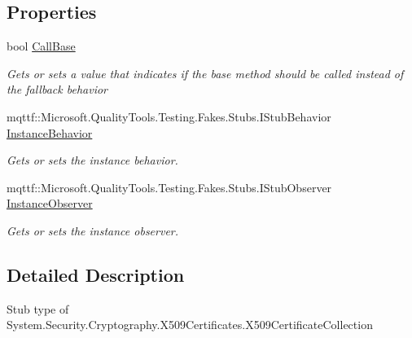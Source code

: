 \subsection*{Properties}
\begin{DoxyCompactItemize}
\item 
bool \hyperlink{class_system_1_1_security_1_1_cryptography_1_1_x509_certificates_1_1_fakes_1_1_stub_x509_certificate_collection_ad9063a236cf97171a35e15c93b04e174}{Call\-Base}
\begin{DoxyCompactList}\small\item\em Gets or sets a value that indicates if the base method should be called instead of the fallback behavior\end{DoxyCompactList}\item 
mqttf\-::\-Microsoft.\-Quality\-Tools.\-Testing.\-Fakes.\-Stubs.\-I\-Stub\-Behavior \hyperlink{class_system_1_1_security_1_1_cryptography_1_1_x509_certificates_1_1_fakes_1_1_stub_x509_certificate_collection_a5500a2884b2c060d254bb068ae03c182}{Instance\-Behavior}
\begin{DoxyCompactList}\small\item\em Gets or sets the instance behavior.\end{DoxyCompactList}\item 
mqttf\-::\-Microsoft.\-Quality\-Tools.\-Testing.\-Fakes.\-Stubs.\-I\-Stub\-Observer \hyperlink{class_system_1_1_security_1_1_cryptography_1_1_x509_certificates_1_1_fakes_1_1_stub_x509_certificate_collection_a3f1004f43101b583ef9dd2fb8a7c59c2}{Instance\-Observer}
\begin{DoxyCompactList}\small\item\em Gets or sets the instance observer.\end{DoxyCompactList}\end{DoxyCompactItemize}


\subsection{Detailed Description}
Stub type of System.\-Security.\-Cryptography.\-X509\-Certificates.\-X509\-Certificate\-Collection



